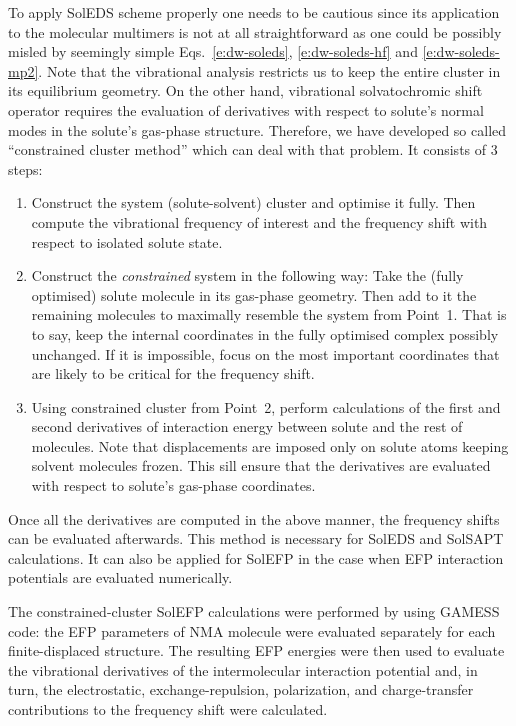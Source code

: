 \documentclass[a4paper,titlepage,twoside,fleqn,12pt]{book}
\begin{document}
\begin{appendices}
\begin{refsection}
To apply SolEDS scheme properly one needs to be cautious 
since its application to the molecular multimers is not at all
straightforward as one could be possibly misled by seemingly simple
Eqs.~\eqref{e:dw-soleds}, \eqref{e:dw-soleds-hf} and \eqref{e:dw-soleds-mp2}. 
Note that the vibrational analysis restricts us to keep the entire cluster
in its equilibrium geometry. On the other hand, vibrational
solvatochromic shift operator requires the evaluation of derivatives
with respect to solute's normal modes in the solute's gas\hyp{}phase
structure. Therefore, we have developed so called ``constrained cluster method''
which can deal with that problem. It consists of 3 steps:
%
\begin{enumerate}
 \item Construct the system (solute\hyp{}solvent) cluster and
       optimise it fully. Then compute the vibrational frequency
       of interest and the frequency shift with respect to isolated
       solute state.
 \item Construct the \emph{constrained} system in the following way:
       Take the (fully optimised) solute molecule in its gas\hyp{}phase
       geometry. Then add to it the remaining molecules to maximally resemble
       the system from Point~1. That is to say, keep the internal coordinates
       in the fully optimised complex possibly unchanged. If it is impossible,
       focus on the most important coordinates that are likely to be critical
       for the frequency shift.
 \item Using constrained cluster from Point~2, perform calculations 
       of the first and second derivatives of interaction energy between
       solute and the rest of molecules. Note that displacements
       are imposed only on solute atoms keeping solvent
       molecules frozen. This sill ensure that the derivatives are evaluated
       with respect to solute's gas\hyp{}phase coordinates.
\end{enumerate}
%
Once all the derivatives are computed in the above manner, the frequency shifts
can be evaluated afterwards. This method is necessary for SolEDS
and SolSAPT calculations. It can also be applied for SolEFP
in the case when EFP interaction potentials are evaluated numerically.

The constrained\hyp{}cluster SolEFP calculations
were performed by using GAMESS code: the EFP parameters
of NMA molecule were evaluated separately for
each finite\hyp{}displaced structure. The resulting EFP energies were then used
to evaluate the vibrational derivatives of the intermolecular
interaction potential and, in turn, the electrostatic, exchange\hyp{}repulsion,
polarization, and charge\hyp{}transfer contributions to
the frequency shift were calculated.


\end{refsection}
\end{appendices}
\end{document}
